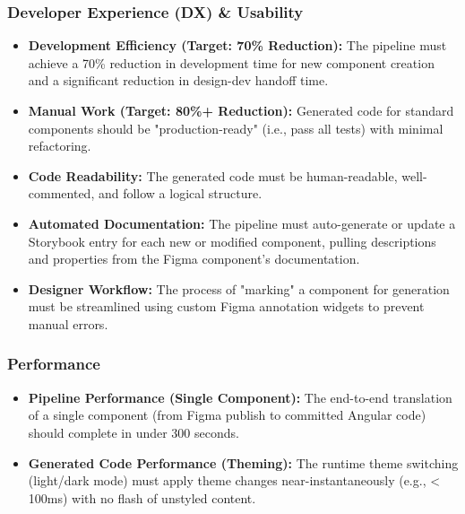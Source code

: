 \subsubsection{Developer Experience (DX) \& Usability}
\begin{itemize}
    \item \textbf{Development Efficiency (Target: 70\% Reduction):} The pipeline must achieve a 70\% reduction in development time for new component creation and a significant reduction in design-dev handoff time.
    \item \textbf{Manual Work (Target: 80\%+ Reduction):} Generated code for standard components should be "production-ready" (i.e., pass all tests) with minimal refactoring.
    \item \textbf{Code Readability:} The generated code must be human-readable, well-commented, and follow a logical structure.
    \item \textbf{Automated Documentation:} The pipeline must auto-generate or update a Storybook entry for each new or modified component, pulling descriptions and properties from the Figma component's documentation.
    \item \textbf{Designer Workflow:} The process of "marking" a component for generation must be streamlined using custom Figma annotation widgets to prevent manual errors.
\end{itemize}

\subsubsection{Performance}
\begin{itemize}
    \item \textbf{Pipeline Performance (Single Component):} The end-to-end translation of a single component (from Figma publish to committed Angular code) should complete in under 300 seconds.
    \item \textbf{Generated Code Performance (Theming):} The runtime theme switching (light/dark mode) must apply theme changes near-instantaneously (e.g., < 100ms) with no flash of unstyled content.
\end{itemize}

